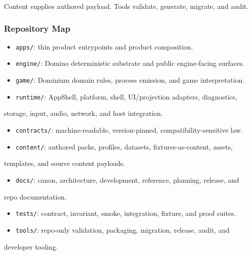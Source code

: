 \documentclass[9pt,a4paper,openany]{book}
\begin{document}
Content supplies authored payload.\allowbreak{} Tools validate, generate, migrate, and audit.\allowbreak{}


\subsubsection{Repository Map}

\begin{itemize}
\item \texttt{apps/\allowbreak{}}: thin product entrypoints and product composition.\allowbreak{}
\item \texttt{engine/\allowbreak{}}: Domino deterministic substrate and public engine-\allowbreak{}facing surfaces.\allowbreak{}
\item \texttt{game/\allowbreak{}}: Dominium domain rules, process emission, and game interpretation.\allowbreak{}
\item \texttt{runtime/\allowbreak{}}: AppShell, platform, shell, UI/\allowbreak{}projection adapters, diagnostics,
\end{itemize}
storage, input, audio, network, and host integration.\allowbreak{}

\begin{itemize}
\item \texttt{contracts/\allowbreak{}}: machine-\allowbreak{}readable, version-\allowbreak{}pinned, compatibility-\allowbreak{}sensitive law.\allowbreak{}
\item \texttt{content/\allowbreak{}}: authored packs, profiles, datasets, fixtures-\allowbreak{}as-\allowbreak{}content, assets,
\end{itemize}
templates, and source content payloads.\allowbreak{}

\begin{itemize}
\item \texttt{docs/\allowbreak{}}: canon, architecture, development, reference, planning, release, and
\end{itemize}
repo documentation.\allowbreak{}

\begin{itemize}
\item \texttt{tests/\allowbreak{}}: contract, invariant, smoke, integration, fixture, and proof suites.\allowbreak{}
\item \texttt{tools/\allowbreak{}}: repo-\allowbreak{}only validation, packaging, migration, release, audit, and
\end{itemize}
developer tooling.\allowbreak{}
\end{document}

